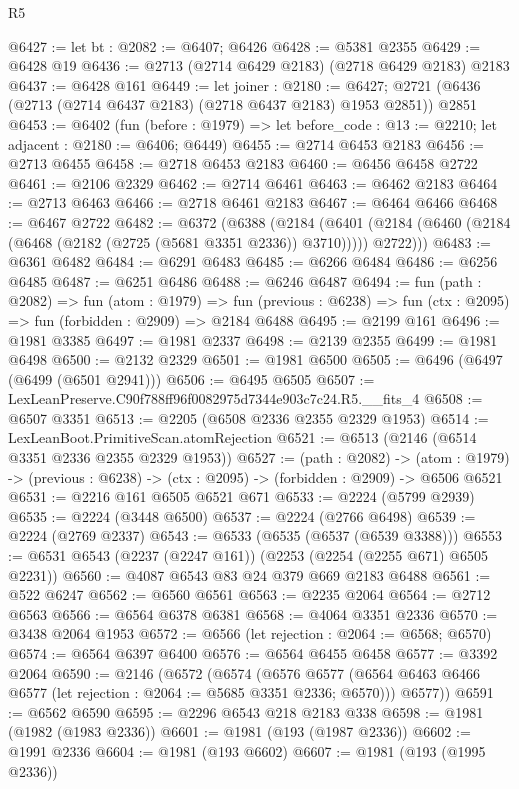 \begin{lexlean}{R5}
\begin{coremodule}
@6427 := let bt : @2082 := @6407; @6426
@6428 := @5381 @2355
@6429 := @6428 @19
@6436 := @2713 (@2714 @6429 @2183) (@2718 @6429 @2183) @2183
@6437 := @6428 @161
@6449 := let joiner : @2180 := @6427;
  @2721 (@6436 (@2713 (@2714 @6437 @2183) (@2718 @6437 @2183) @1953 @2851)) @2851
@6453 := @6402
    (fun (before : @1979) => let before_code : @13 := @2210; let adjacent : @2180 := @6406; @6449)
@6455 := @2714 @6453 @2183
@6456 := @2713 @6455
@6458 := @2718 @6453 @2183
@6460 := @6456 @6458 @2722
@6461 := @2106 @2329
@6462 := @2714 @6461
@6463 := @6462 @2183
@6464 := @2713 @6463
@6466 := @2718 @6461 @2183
@6467 := @6464 @6466
@6468 := @6467 @2722
@6482 := @6372
    (@6388
      (@2184
        (@6401 (@2184 (@6460 (@2184 (@6468 (@2182 (@2725 (@5681 @3351 @2336)) @3710))))) @2722)))
@6483 := @6361 @6482
@6484 := @6291 @6483
@6485 := @6266 @6484
@6486 := @6256 @6485
@6487 := @6251 @6486
@6488 := @6246 @6487
@6494 := fun (path : @2082) =>
  fun (atom : @1979) =>
  fun (previous : @6238) => fun (ctx : @2095) => fun (forbidden : @2909) => @2184 @6488
@6495 := @2199 @161
@6496 := @1981 @3385
@6497 := @1981 @2337
@6498 := @2139 @2355
@6499 := @1981 @6498
@6500 := @2132 @2329
@6501 := @1981 @6500
@6505 := @6496 (@6497 (@6499 (@6501 @2941)))
@6506 := @6495 @6505
@6507 := LexLeanPreserve.C90f788ff96f0082975d7344e903c7c24.R5.__fits_4
@6508 := @6507 @3351
@6513 := @2205 (@6508 @2336 @2355 @2329 @1953)
@6514 := LexLeanBoot.PrimitiveScan.atomRejection
@6521 := @6513 (@2146 (@6514 @3351 @2336 @2355 @2329 @1953))
@6527 := (path : @2082) ->
  (atom : @1979) -> (previous : @6238) -> (ctx : @2095) -> (forbidden : @2909) -> @6506 @6521
@6531 := @2216 @161 @6505 @6521 @671
@6533 := @2224 (@5799 @2939)
@6535 := @2224 (@3448 @6500)
@6537 := @2224 (@2766 @6498)
@6539 := @2224 (@2769 @2337)
@6543 := @6533 (@6535 (@6537 (@6539 @3388)))
@6553 := @6531 @6543 (@2237 (@2247 @161)) (@2253 (@2254 (@2255 @671) @6505 @2231))
@6560 := @4087 @6543 @83 @24 @379 @669 @2183 @6488
@6561 := @522 @6247
@6562 := @6560 @6561
@6563 := @2235 @2064
@6564 := @2712 @6563
@6566 := @6564 @6378 @6381
@6568 := @4064 @3351 @2336
@6570 := @3438 @2064 @1953
@6572 := @6566 (let rejection : @2064 := @6568; @6570)
@6574 := @6564 @6397 @6400
@6576 := @6564 @6455 @6458
@6577 := @3392 @2064
@6590 := @2146
    (@6572
      (@6574
        (@6576 @6577 (@6564 @6463 @6466 @6577 (let rejection : @2064 := @5685 @3351 @2336; @6570)))
        @6577))
@6591 := @6562 @6590
@6595 := @2296 @6543 @218 @2183 @338
@6598 := @1981 (@1982 (@1983 @2336))
@6601 := @1981 (@193 (@1987 @2336))
@6602 := @1991 @2336
@6604 := @1981 (@193 @6602)
@6607 := @1981 (@193 (@1995 @2336))

\end{coremodule}
\end{lexlean}
